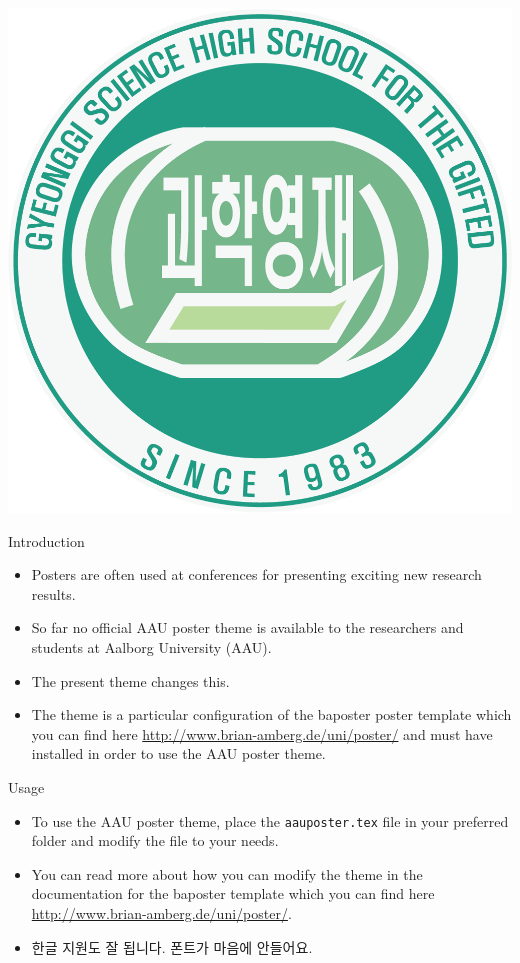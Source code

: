 \documentclass[a0paper,portrait]{baposter}
\newcommand{\alert}[1]{{\color{aaublue1}#1}}
\begin{document}
\begin{poster}
{  \includegraphics[height=0.75\headerheight]{./logo/gshslogo_green.png}
}


\begin{posterbox}[name=intro,column=0,row=0]{Introduction}
\begin{itemize}
  \item Posters are often used at conferences for presenting exciting new research results.
  \item So far no official AAU poster theme is available to the researchers and students at Aalborg University (AAU).
  \item The present theme changes this.
  \item The theme is a particular configuration of the \alert{baposter} poster template \cite{baposter} which you can find here \url{http://www.brian-amberg.de/uni/poster/} and must have installed in order to use the AAU poster theme.
\end{itemize}
\end{posterbox}

\begin{posterbox}[name=usage,column=0,below=intro]{Usage}
\begin{itemize}
  \item To use the AAU poster theme, place the {\tt aauposter.tex} file in your preferred folder and modify the file to your needs.
  \item You can read more about how you can modify the theme in the documentation for the baposter template which you can find here \url{http://www.brian-amberg.de/uni/poster/}.
  \item \footnotesize 한글 지원도 잘 됩니다. 폰트가 마음에 안들어요.
\end{itemize}
\end{posterbox}


\end{poster}
\end{document}
